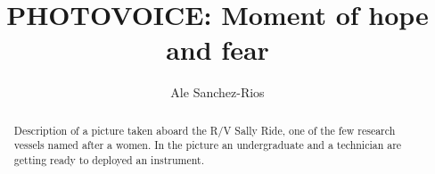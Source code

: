 \documentclass{tufte-handout}
\title{PHOTOVOICE: Moment of hope and fear}
\author[Ale Sanchez-Rios]{Ale Sanchez-Rios}
\begin{document}
\maketitle%

\begin{abstract}
\noindent Description of a picture taken aboard the R/V Sally Ride, one of the few research vessels named after a women. In the picture an undergraduate and a technician are getting ready to deployed an instrument. 
\end{abstract}


\end{document}
